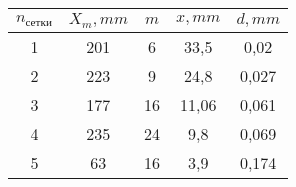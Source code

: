 \begin{tabular}{| c | c | c | c | c |}
    \hline
    $n_{сетки}$ & $X_m, mm$ & $m$ & $x, mm$  & $d, mm$\\
    \hline
    1 & 201 & 6 & 33,5  &  0,02 \\
    \hline
    2 & 223 & 9 & 24,8  &   0,027 \\
    \hline
    3 & 177 & 16 & 11,06 &   0,061  \\
    \hline
    4 & 235 & 24 & 9,8   &  0,069  \\
    \hline
    5 & 63 & 16 & 3,9    &   0,174  \\
    \hline
    \end{tabular}
    